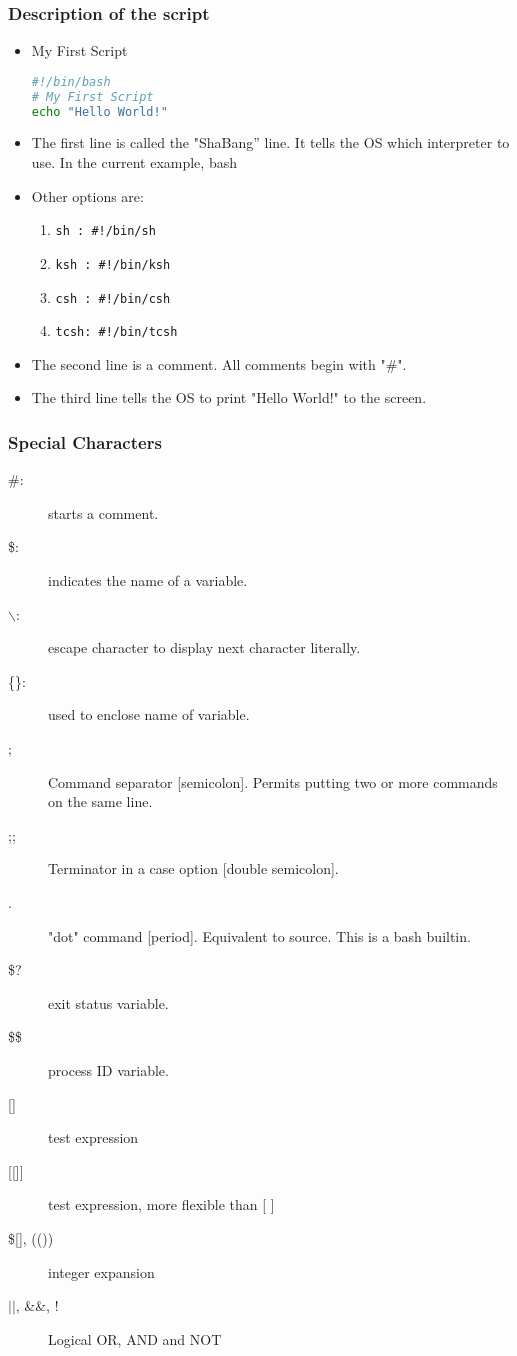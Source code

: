 \documentclass[10pt,t]{beamer}
\newcommand*\vardiamond{\textcolor{lubrown}{%
  \ensuremath{\blacklozenge}}}
\begin{document}
\begin{frame}[fragile]
  \frametitle{Description of the script}
  \begin{itemize}
    \item My First Script
  \begin{lstlisting}[language=bash]
#!/bin/bash
# My First Script
echo "Hello World!"
  \end{lstlisting}
    \item The first line is called the "ShaBang'' line. It tells the OS which interpreter to use. In the current example, bash
    \item Other options are:
    \begin{enumerate}
        \item[$\vardiamond$] \texttt{sh\quad\,:   \#!/bin/sh}
        \item[$\vardiamond$] \texttt{ksh :  \#!/bin/ksh}
        \item[$\vardiamond$] \texttt{csh :  \#!/bin/csh}
        \item[$\vardiamond$] \texttt{tcsh: \#!/bin/tcsh}
    \end{enumerate}
    \item The second line is a comment. All comments begin with "\#".
    \item The third line tells the OS to print "Hello World!" to the screen.
  \end{itemize}
\end{frame}

\begin{frame}
  \frametitle{Special Characters}
  \begin{description}
    \item[\#:] starts a comment.
    \item[\$:] indicates the name of a variable.
    \item[$\backslash$:] escape character to display next character literally.
    \item[\{\quad\}:] used to enclose name of variable.
    \item[;] Command separator [semicolon]. Permits putting two or more commands on the same line.
    \item[;;] Terminator in a case option [double semicolon].
    \item[.] "dot" command [period]. Equivalent to source. This is a bash builtin.
    \item[\$?] exit status variable.
    \item[\$\$] process ID variable.
    \item[{[\quad]}] test expression
    \item[{[[\quad]]}] test expression, more flexible than [ ] 
    \item[{\$[\quad], ((\quad))}] integer expansion
    \item[$||$, \&\&, !] Logical OR, AND and NOT
  \end{description}

\end{frame}
\end{document}

